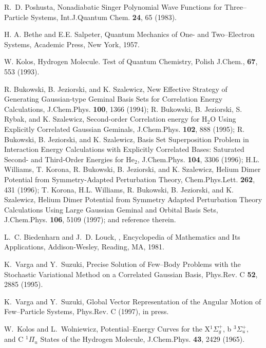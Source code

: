 \begin{thebibliography}{999}
R.~D. Poshusta,
Nonadiabatic Singer Polynomial Wave Functions for 
Three--Particle Systems,
\newblock Int.J.Quantum Chem. 
{\bf 24}, 65 (1983).


H. A. Bethe and E.E. Salpeter, {\rm Quantum Mechanics of One- and
Two--Electron Systems}, Academic Press, New York, 1957.

W. Kolos, Hydrogen Molecule. Test of Quantum Chemistry,
Polish J.Chem., {\bf 67}, 553 (1993).



R. Bukowski, B. Jeziorski, and K. Szalewicz,
New Effective Strategy of Generating Gaussian-type Geminal
Basis Sets for Correlation Energy Calculations,
J.Chem.Phys. {\bf 100}, 1366 (1994);
R. Bukowski, B. Jeziorski, S. Rybak, and K. Szalewicz,
Second-order Correlation energy for H$_2$O Using
Explicitly Correlated Gaussian Geminals,
J.Chem.Phys. {\bf 102}, 888 (1995);
R. Bukowski, B. Jeziorski, and K. Szalewicz,
Basis Set Superposition Problem in Interaction Energy
Calculations with Explicitly Correlated Bases:
Saturated Second- and Third-Order Energies for He$_2$,
J.Chem.Phys. {\bf 104}, 3306 (1996);
H.L. Williams, T. Korona, R. Bukowski, B. Jeziorski, and K. Szalewicz,
Helium Dimer Potential from Symmetry-Adapted
Perturbation Theory,
Chem.Phys.Lett. {\bf 262}, 431 (1996);
T. Korona, H.L. Williams, R. Bukowski,
B. Jeziorski, and K. Szalewicz,
Helium Dimer Potential from Symmetry Adapted Perturbation Theory
Calculations Using Large Gaussian Geminal and Orbital Basis Sets,
J.Chem.Phys. {\bf 106}, 5109 (1997);
and reference therein.


L.~C. Biedenharn and J.~D. Louck,
,
\newblock Encyclopedia of Mathematics and Its Applications, Addison-{W}esley,
Reading, {MA}, 1981.

K.~Varga and Y.~Suzuki,
Precise Solution of Few--Body Problems with the
Stochastic Variational Method on a Correlated Gaussian Basis,
\newblock Phys.Rev. C {\bf 52}, 2885 (1995).


K.~Varga and Y.~Suzuki,
Global Vector Representation of the Angular Motion of
Few--Particle Systems,
\newblock Phys.Rev. C  (1997),
\newblock in press.

W.~Kolos and L.~Wolniewicz,
Potential--Energy Curves for the X$^{1} \Sigma _g^+$, 
b $^{3}\Sigma_u ^+,$
and C $^{1} \Pi_u$ States of the Hydrogen Molecule,
\newblock J.Chem.Phys. {\bf 43}, 2429 (1965).


\end{thebibliography}
